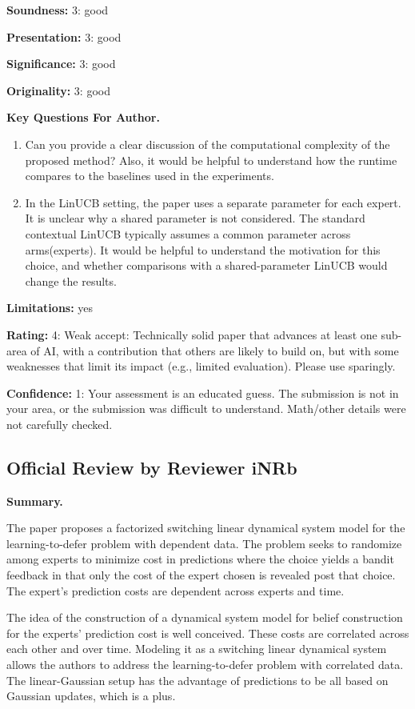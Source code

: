\textbf{Soundness:} 3: good

\textbf{Presentation:} 3: good

\textbf{Significance:} 3: good

\textbf{Originality:} 3: good

\textbf{Key Questions For Author.}
\begin{enumerate}
    \item Can you provide a clear discussion of the computational complexity of the proposed method? Also, it would be helpful to understand how the runtime compares to the baselines used in the experiments.
    \item In the LinUCB setting, the paper uses a separate parameter for each expert. It is unclear why a shared parameter is not considered. The standard contextual LinUCB typically assumes a common parameter across arms(experts). It would be helpful to understand the motivation for this choice, and whether comparisons with a shared-parameter LinUCB would change the results.
\end{enumerate}

\textbf{Limitations:} yes

\textbf{Rating:} 4: Weak accept: Technically solid paper that advances at least one sub-area of AI, with a contribution that others are likely to build on, but with some weaknesses that limit its impact (e.g., limited evaluation). Please use sparingly.

\textbf{Confidence:} 1: Your assessment is an educated guess. The submission is not in your area, or the submission was difficult to understand. Math/other details were not carefully checked.


\subsection*{Official Review by Reviewer iNRb}

\textbf{Summary.}

The paper proposes a factorized switching linear dynamical system model for the learning-to-defer problem with dependent data. The problem seeks to randomize among experts to minimize cost in predictions where the choice yields a bandit feedback in that only the cost of the expert chosen is revealed post that choice. The expert's prediction costs are dependent across experts and time.

The idea of the construction of a dynamical system model for belief construction for the experts' prediction cost is well conceived. These costs are correlated across each other and over time. Modeling it as a switching linear dynamical system allows the authors to address the learning-to-defer problem with correlated data. The linear-Gaussian setup has the advantage of predictions to be all based on Gaussian updates, which is a plus.

